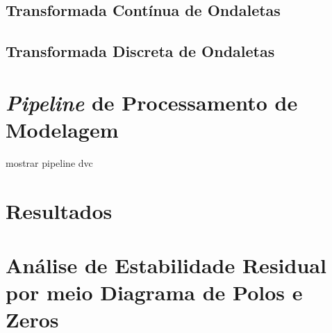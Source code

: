 \subsection{Transformada Contínua de Ondaletas}

\subsection{Transformada Discreta de Ondaletas}

\section{\emph{Pipeline} de Processamento de Modelagem}

mostrar pipeline dvc%

\section{Resultados}

\section{Análise de Estabilidade Residual por meio Diagrama de Polos e Zeros}
